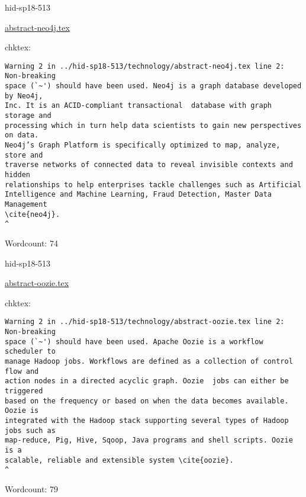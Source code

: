 

\begin{IU}

hid-sp18-513

\href{https://github.com/cloudmesh-community/hid-sp18-513/blob/master//technology/abstract-neo4j.tex}{abstract-neo4j.tex}

 
chktex:
\begin{tiny}
\begin{verbatim}
Warning 2 in ../hid-sp18-513/technology/abstract-neo4j.tex line 2: Non-breaking
space (`~') should have been used. Neo4j is a graph database developed by Neo4j,
Inc. It is an ACID-compliant transactional  database with graph storage and
processing which in turn help data scientists to gain new perspectives on data.
Neo4j’s Graph Platform is specifically optimized to map, analyze, store and
traverse networks of connected data to reveal invisible contexts and hidden
relationships to help enterprises tackle challenges such as Artificial
Intelligence and Machine Learning, Fraud Detection, Master Data Management
\cite{neo4j}.
^
\end{verbatim}
\end{tiny}

Wordcount: 74

\end{IU}



\begin{IU}

hid-sp18-513

\href{https://github.com/cloudmesh-community/hid-sp18-513/blob/master//technology/abstract-oozie.tex}{abstract-oozie.tex}

 
chktex:
\begin{tiny}
\begin{verbatim}
Warning 2 in ../hid-sp18-513/technology/abstract-oozie.tex line 2: Non-breaking
space (`~') should have been used. Apache Oozie is a workflow scheduler to
manage Hadoop jobs. Workflows are defined as a collection of control flow and
action nodes in a directed acyclic graph. Oozie  jobs can either be triggered
based on the frequency or based on when the data becomes available. Oozie is
integrated with the Hadoop stack supporting several types of Hadoop jobs such as
map-reduce, Pig, Hive, Sqoop, Java programs and shell scripts. Oozie is a
scalable, reliable and extensible system \cite{oozie}.
^
\end{verbatim}
\end{tiny}

Wordcount: 79

\end{IU}

